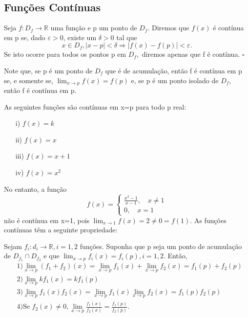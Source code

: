 \documentclass[analysis_notes.tex]{subfiles}
\begin{document}
\subsection{Fun\c c\~oes Cont\'inuas}
\begin{def*}
	Seja $f:D_{f}\rightarrow \mathbb{R}$ uma fun\c c\~ao e p um ponto de $D_{f}.$ Diremos que $f(x)$ \'e cont\'inua em p
	se, dado $\varepsilon > 0$, existe um $\delta > 0$ tal que
	$$
		x\in D_{f}, |x-p|<\delta \Rightarrow |f(x)-f(p)|<\varepsilon.
	$$
	Se isto ocorre para todos os pontos p em $D_{f},$ diremos apenas que f \'e cont\'inua. $\square$
\end{def*}
Note que, se p \'e um ponto de $D_{f}$ que \'e de acumula\c c\~ao, ent\~ao f \'e cont\'inua em p se, e somente se,
$\lim_{x\to p}f(x)=f(p)$ e, se p \'e um ponto isolado de $D_{f},$ ent\~ao f \'e cont\'inua em p.
\begin{example}
	As seguintes fun\c c\~oes s\~ao cont\'inuas em x=p para todo p real:
	\begin{itemize}
		\item[i)]$f(x) = k$
		\item[ii)]$f(x) = x$
		\item[iii)]$f(x) = x + 1$
		\item[iv)]$f(x) = x^{2}$
	\end{itemize}
\end{example}
No entanto, a fun\c c\~ao
$$
	f(x) = \left\{\begin{array}{ll}
		\frac{x^{2}-1}{x-1},\quad x\neq 1 \\
		0,\quad x=1
	\end{array}\right.
$$
n\~ao \'e cont\'inua em x=1, pois $\lim_{x\to 1}f(x) = 2\neq 0 = f(1).$
As fun\c c\~oes cont\'inuas t\^em a seguinte propriedade:
\begin{theorem*}
	Sejam $f_{i}:d_{i}\rightarrow \mathbb{R},i=1,2$ fun\c c\~oes. Suponha que p seja um ponto de acumula\c c\~ao de
	$D_{f_{1}}\cap{D_{f_{2}}}$ e que $\lim_{x\to p}f_{i}(x) = f_{i}(p), i=1, 2.$ Ent\~ao,
	\begin{align*}
		 & 1) \lim_{x\to p}(f_{1}+f_{2})(x) = \lim_{x\to p}f_{1}(x) + \lim_{x\to p}f_{2}(x) = f_{1}(p)+f_{2}(p) \\
		 & 2) \lim_{x\to p}kf_{1}(x) = kf_{1}(p)                                                                \\
		 & 3) \lim_{x\to p}f_{1}(x)f_{2}(x) = \lim_{x\to p}f_{1}(x)\lim_{x\to p}f_{2}(x) = f_{1}(p)f_{2}(p)     \\
		 & 4) \text{Se } f_{2}(x)\neq0, \lim_{x\to p}\frac{f_{1}(x)}{f_{2}(x)} = \frac{f_{1}(p)}{f_{2}(p)}.
	\end{align*}
\end{theorem*}
\end{document}
